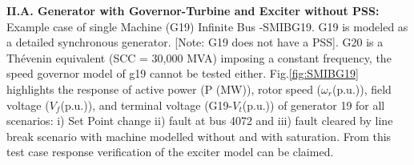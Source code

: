 \documentclass{report}
\begin{document}
\textbf{II.A. Generator with Governor-Turbine and Exciter without PSS:} Example case of single Machine (G19) Infinite Bus -SMIBG19. G19 is modeled as a detailed synchronous generator.
[Note: G19 does not have a PSS]. G20 is a Thévenin equivalent (SCC = 30,000 MVA) imposing a constant frequency, the speed governor model of g19 cannot be tested either. Fig.\ref{fig:SMIBG19} highlights the response of active power (P (MW)), rotor speed ($\omega_r$(p.u.)), field voltage ($V_f$(p.u.)), and terminal voltage (G19-$V_t$(p.u.)) of generator 19 for all scenarios:  i) Set Point change ii) fault at bus 4072 and iii) fault cleared by line break scenario with machine modelled without and with saturation. From this test case response verification of the exciter model can be claimed. 

\begin{figure}[htbp]
  \centering
  \hfill
  \\
\end{figure}
\end{document}
